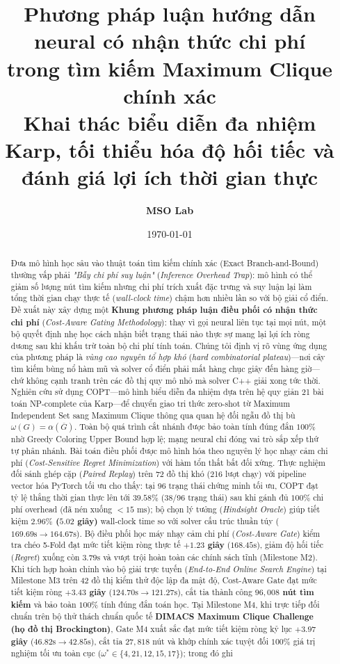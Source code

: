 \documentclass[11pt,a4paper]{article}
\title{\Large Phương pháp luận hướng dẫn neural có nhận thức chi phí\\trong tìm kiếm Maximum Clique chính xác\\[0.4em]
\large Khai thác biểu diễn đa nhiệm Karp, tối thiểu hóa độ hối tiếc và đánh giá lợi ích thời gian thực}
\author{\textbf{MSO Lab}}
\date{\today}
\begin{document}
\maketitle

\begin{abstract}
Đưa mô hình học sâu vào thuật toán tìm kiếm chính xác (Exact Branch-and-Bound) thường vấp phải \textit{"Bẫy chi phí suy luận"} (\textit{Inference Overhead Trap}): mô hình có thể giảm số lượng nút tìm kiếm nhưng chi phí trích xuất đặc trưng và suy luận lại làm tổng thời gian chạy thực tế (\textit{wall-clock time}) chậm hơn nhiều lần so với bộ giải cổ điển. Đề xuất này xây dựng một \textbf{Khung phương pháp luận điều phối có nhận thức chi phí} (\textit{Cost-Aware Gating Methodology}): thay vì gọi neural liên tục tại mọi nút, một bộ quyết định nhẹ học cách nhận biết trạng thái nào thực sự mang lại lợi ích ròng dương sau khi khấu trừ toàn bộ chi phí tính toán. Chúng tôi định vị rõ vùng ứng dụng của phương pháp là \textit{vùng cao nguyên tổ hợp khó} (\textit{hard combinatorial plateau})---nơi cây tìm kiếm bùng nổ hàm mũ và solver cổ điển phải mất hàng chục giây đến hàng giờ---chứ không cạnh tranh trên các đồ thị quy mô nhỏ mà solver C++ giải xong tức thời. Nghiên cứu sử dụng COPT---mô hình biểu diễn đa nhiệm dựa trên hệ quy giản 21 bài toán NP-complete của Karp---để chuyển giao tri thức zero-shot từ Maximum Independent Set sang Maximum Clique thông qua quan hệ đối ngẫu đồ thị bù $\omega(G)=\alpha(\overline{G})$. Toàn bộ quá trình cắt nhánh được bảo toàn tính đúng đắn $100\%$ nhờ Greedy Coloring Upper Bound hợp lệ; mạng neural chỉ đóng vai trò sắp xếp thứ tự phân nhánh. Bài toán điều phối được mô hình hóa theo nguyên lý học nhạy cảm chi phí (\textit{Cost-Sensitive Regret Minimization}) với hàm tổn thất bất đối xứng. Thực nghiệm đối sánh ghép cặp (\textit{Paired Replay}) trên 72 đồ thị khó (216 lượt chạy) với pipeline vector hóa PyTorch tối ưu cho thấy: tại 96 trạng thái chứng minh tối ưu, COPT đạt tỷ lệ thắng thời gian thực lên tới \textbf{$39.58\%$} (38/96 trạng thái) sau khi gánh đủ $100\%$ chi phí overhead (đã nén xuống $<15\text{ ms}$); bộ chọn lý tưởng (\textit{Hindsight Oracle}) giúp tiết kiệm \textbf{$2.96\%$ ($5.02$ giây)} wall-clock time so với solver cấu trúc thuần túy ($169.69\text{s} \to 164.67\text{s}$). Bộ điều phối học máy nhạy cảm chi phí (\textit{Cost-Aware Gate}) kiểm tra chéo 5-Fold đạt mức tiết kiệm ròng thực tế \textbf{$+1.23$ giây} ($168.45\text{s}$), giảm độ hối tiếc (\textit{Regret}) xuống còn $3.79\text{s}$ và vượt trội hoàn toàn các chính sách tĩnh (Milestone M2). Khi tích hợp hoàn chỉnh vào bộ giải trực tuyến (\textit{End-to-End Online Search Engine}) tại Milestone M3 trên 42 đồ thị kiểm thử độc lập đa mật độ, Cost-Aware Gate đạt mức tiết kiệm ròng \textbf{$+3.43$ giây} ($124.70\text{s} \to 121.27\text{s}$), cắt tỉa thành công \textbf{$96,008$ nút tìm kiếm} và bảo toàn $100\%$ tính đúng đắn toán học. Tại Milestone M4, khi trực tiếp đối chuẩn trên bộ thử thách chuẩn quốc tế \textbf{DIMACS Maximum Clique Challenge (họ đồ thị Brockington)}, Gate M4 xuất sắc đạt mức tiết kiệm ròng kỷ lục \textbf{$+3.97$ giây} ($46.82\text{s} \to 42.85\text{s}$), cắt tỉa $27,818$ nút và khớp chính xác tuyệt đối $100\%$ giá trị nghiệm tối ưu toàn cục ($\omega^* \in \{4, 21, 12, 15, 17\}$); trong đó ghi 
\end{abstract}
\end{document}
